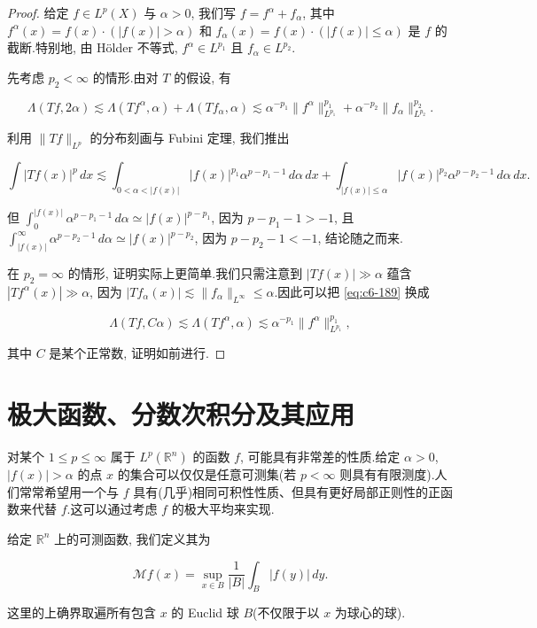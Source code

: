 \begin{proof}
给定 $f\in L^p(X)$ 与 $\alpha>0$, 我们写 $f = f^\alpha + f_\alpha$, 其中 $f^\alpha(x) = f(x)\cdot(|f(x)| > \alpha)$ 和 $f_\alpha(x) = f(x)\cdot(|f(x)| \le \alpha)$ 是 $f$ 的截断.特别地, 由 Hölder 不等式, $f^\alpha\in L^{p_1}$ 且 $f_\alpha\in L^{p_2}$.

先考虑 $p_2<\infty$ 的情形.由对 $T$ 的假设, 有

\begin{equation}
\Lambda(Tf, 2\alpha) \lesssim \Lambda(Tf^\alpha, \alpha) + \Lambda(Tf_\alpha, \alpha) \lesssim \alpha^{-p_1}\|f^\alpha\|_{L^{p_1}}^{p_1} + \alpha^{-p_2}\|f_\alpha\|_{L^{p_2}}^{p_2}.\label{eq:c6-189}
\end{equation}

利用 $\|Tf\|_{L^p}$ 的分布刻画与 Fubini 定理, 我们推出

\[
\int|Tf(x)|^p\, dx \lesssim \int_{0<\alpha<|f(x)|}|f(x)|^{p_1}\alpha^{p-p_1-1}\, d\alpha\, dx + \int_{|f(x)|\le\alpha}|f(x)|^{p_2}\alpha^{p-p_2-1}\, d\alpha\, dx.
\]

但 $\int_0^{|f(x)|}\alpha^{p-p_1-1}\, d\alpha \simeq |f(x)|^{p-p_1}$, 因为 $p-p_1-1>-1$, 且 $\int_{|f(x)|}^\infty\alpha^{p-p_2-1}\, d\alpha \simeq |f(x)|^{p-p_2}$, 因为 $p-p_2-1<-1$, 结论随之而来.

在 $p_2 = \infty$ 的情形, 证明实际上更简单.我们只需注意到 $|Tf(x)|\gg\alpha$ 蕴含 $|Tf^\alpha(x)|\gg\alpha$, 因为 $|Tf_\alpha(x)|\lesssim\|f_\alpha\|_{L^\infty}\le\alpha$.因此可以把 \eqref{eq:c6-189} 换成

\[
\Lambda(Tf, C\alpha) \lesssim \Lambda(Tf^\alpha, \alpha) \lesssim \alpha^{-p_1}\|f^\alpha\|_{L^{p_1}}^{p_1},
\]

其中 $C$ 是某个正常数, 证明如前进行.
\end{proof}
\section{极大函数、分数次积分及其应用}


对某个 $1\le p\le\infty$ 属于 $L^p(\mathbb{R}^n)$ 的函数 $f$, 可能具有非常差的性质.给定 $\alpha>0$, $|f(x)|>\alpha$ 的点 $x$ 的集合可以仅仅是任意可测集(若 $p<\infty$ 则具有有限测度).人们常常希望用一个与 $f$ 具有(几乎)相同可积性性质、但具有更好局部正则性的正函数来代替 $f$.这可以通过考虑 $f$ 的极大平均来实现.

\begin{definition}\label{def:c6-2.2}
给定 $\mathbb{R}^n$ 上的可测函数, 我们定义其为

\[
\mathcal{M}f(x) = \sup_{x\in B}\frac{1}{|B|}\int_B |f(y)|\, dy.
\]

这里的上确界取遍所有包含 $x$ 的 Euclid 球 $B$(不仅限于以 $x$ 为球心的球).
\end{definition}

